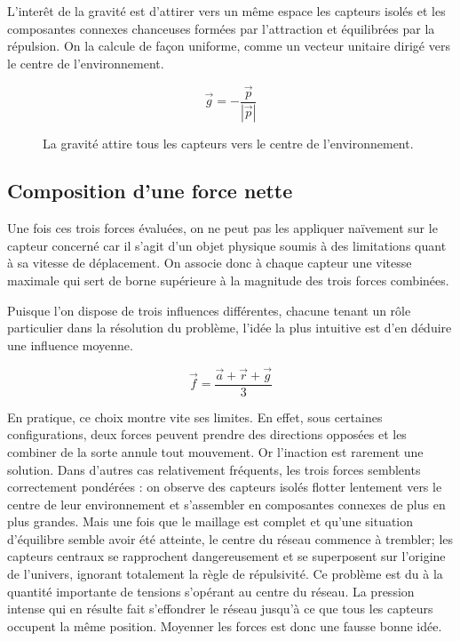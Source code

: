 \documentclass[10pt]{article}
\begin{document}
\begin{multicols}{2}
L'interêt de la gravité est d'attirer vers un même espace les capteurs
isolés et les composantes connexes chanceuses formées par l'attraction
et équilibrées par la répulsion. On la calcule de façon uniforme,
comme un vecteur unitaire dirigé vers le centre de l'environnement.

$$
\vec{g} = -\frac{\vec{p}}{|\vec{p}|}
$$

\begin{figure}[H]

  \centering

  

  \caption{La gravité attire tous les capteurs vers le centre de
    l'environnement.}
  \label{gravite}

\end{figure}

\subsection*{Composition d'une force nette}

Une fois ces trois forces évaluées, on ne peut pas les appliquer
naïvement sur le capteur concerné car il s'agit d'un objet physique
soumis à des limitations quant à sa vitesse de déplacement. On associe
donc à chaque capteur une vitesse maximale qui sert de borne
supérieure à la magnitude des trois forces combinées.

Puisque l'on dispose de trois influences différentes, chacune tenant
un rôle particulier dans la résolution du problème, l'idée la plus
intuitive est d'en déduire une influence moyenne.

$$
\vec{f} = \frac{\vec{a} + \vec{r} + \vec{g}}{3}
$$

En pratique, ce choix montre vite ses limites. En effet, sous
certaines configurations, deux forces peuvent prendre des directions
opposées et les combiner de la sorte annule tout mouvement. Or
l'inaction est rarement une solution. Dans d'autres cas relativement
fréquents, les trois forces semblents correctement pondérées : on
observe des capteurs isolés flotter lentement vers le centre de leur
environnement et s'assembler en composantes connexes de plus en plus
grandes. Mais une fois que le maillage est complet et qu'une situation
d'équilibre semble avoir été atteinte, le centre du réseau commence à
trembler; les capteurs centraux se rapprochent dangereusement et se
superposent sur l'origine de l'univers, ignorant totalement la règle
de répulsivité. Ce problème est du à la quantité importante de
tensions s'opérant au centre du réseau. La pression intense qui en
résulte fait s'effondrer le réseau jusqu'à ce que tous les capteurs
occupent la même position. Moyenner les forces est donc une fausse
bonne idée.


\end{multicols}
\end{document}
